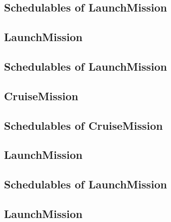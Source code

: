 \documentclass[10pt,a4paper]{article}
\begin{document}
\subsection{Schedulables of LaunchMission}


\newpage


\subsection{LaunchMission}

\newpage

\subsection{Schedulables of LaunchMission}


\newpage


\subsection{CruiseMission}

\newpage

\subsection{Schedulables of CruiseMission}


\newpage


\newpage


\newpage


\subsection{LaunchMission}

\newpage

\subsection{Schedulables of LaunchMission}


\newpage


\subsection{LaunchMission}

\newpage
\end{document}
